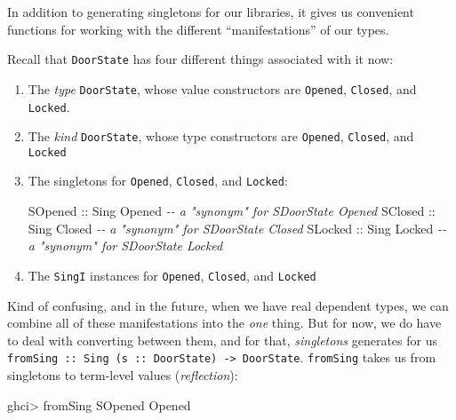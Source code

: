 \documentclass[]{article}
\newenvironment{Shaded}{}{}
\newcommand{\CommentTok}[1]{\textcolor[rgb]{0.38,0.63,0.69}{\textit{#1}}}
\newcommand{\DataTypeTok}[1]{\textcolor[rgb]{0.56,0.13,0.00}{#1}}
\newcommand{\NormalTok}[1]{#1}
\newcommand{\OperatorTok}[1]{\textcolor[rgb]{0.40,0.40,0.40}{#1}}
\newcommand{\OtherTok}[1]{\textcolor[rgb]{0.00,0.44,0.13}{#1}}
\begin{document}
In addition to generating singletons for our libraries, it gives us convenient
functions for working with the different ``manifestations'' of our types.

Recall that \texttt{DoorState} has four different things associated with it now:

\begin{enumerate}
\def\labelenumi{\arabic{enumi}.}
\item
  The \emph{type} \texttt{DoorState}, whose value constructors are
  \texttt{Opened}, \texttt{Closed}, and \texttt{Locked}.
\item
  The \emph{kind} \texttt{DoorState}, whose type constructors are
  \texttt{\textquotesingle{}Opened}, \texttt{\textquotesingle{}Closed}, and
  \texttt{\textquotesingle{}Locked}
\item
  The singletons for \texttt{\textquotesingle{}Opened},
  \texttt{\textquotesingle{}Closed}, and \texttt{\textquotesingle{}Locked}:

\begin{Shaded}
\begin{Highlighting}[]
\DataTypeTok{SOpened}\OtherTok{ ::} \DataTypeTok{Sing} \DataTypeTok{\textquotesingle{}Opened}             \CommentTok{{-}{-} a "synonym" for SDoorState \textquotesingle{}Opened}
\DataTypeTok{SClosed}\OtherTok{ ::} \DataTypeTok{Sing} \DataTypeTok{\textquotesingle{}Closed}             \CommentTok{{-}{-} a "synonym" for SDoorState \textquotesingle{}Closed}
\DataTypeTok{SLocked}\OtherTok{ ::} \DataTypeTok{Sing} \DataTypeTok{\textquotesingle{}Locked}             \CommentTok{{-}{-} a "synonym" for SDoorState \textquotesingle{}Locked}
\end{Highlighting}
\end{Shaded}
\item
  The \texttt{SingI} instances for \texttt{\textquotesingle{}Opened},
  \texttt{\textquotesingle{}Closed}, and
  \texttt{\textquotesingle{}Locked\textquotesingle{}}
\end{enumerate}

Kind of confusing, and in the future, when we have real dependent types, we can
combine all of these manifestations into the \emph{one} thing. But for now, we
do have to deal with converting between them, and for that, \emph{singletons}
generates for us
\texttt{fromSing\ ::\ Sing\ (s\ ::\ DoorState)\ -\textgreater{}\ DoorState}.
\texttt{fromSing} takes us from singletons to term-level values
(\emph{reflection}):

\begin{Shaded}
\begin{Highlighting}[]
\NormalTok{ghci}\OperatorTok{>}\NormalTok{ fromSing }\DataTypeTok{SOpened}
\DataTypeTok{Opened}
\end{Highlighting}
\end{Shaded}
\end{document}
